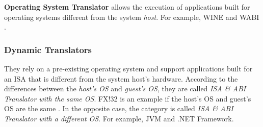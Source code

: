 	\textbf{Operating System Translator} allows the execution of applications built for operating systems different from the system \textit{host}. For example, WINE \cite{Wine} and WABI \cite{WABI}.
		
	\subsubsection {Dynamic Translators}
	
	They rely on a pre-existing operating system and support applications built for an ISA that is different from the system host's hardware. According to the differences between the \textit{host's OS} and \textit{guest's OS}, they are called \textit{ISA \& ABI Translator with the same OS}. FX!32 is an example if the host's OS and guest's OS are the same \cite{Chernoff1998}. In the opposite case, the category is called \textit{ISA \& ABI Translator with a different OS}. For example, JVM and .NET Framework.
	

